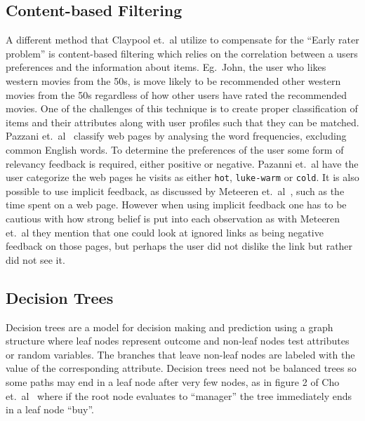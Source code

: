 
\subsection{Content-based Filtering}
\label{sec:analysis:recommender-methods:content-based-filtering}

A different method that Claypool et.~al utilize to compensate for the ``Early rater problem'' is content-based filtering which relies on the correlation between a users preferences and the information about items.
Eg.~John, the user who likes western movies from the 50s, is move likely to be recommended other western movies from the 50s regardless of how other users have rated the recommended movies.
One of the challenges of this technique is to create proper classification of items and their attributes along with user profiles such that they can be matched.
Pazzani et.~al~\cite{pazzani1996syskill} classify web pages by analysing the word frequencies, excluding common English words.
To determine the preferences of the user some form of relevancy feedback is required, either positive or negative.
Pazanni et.~al have the user categorize the web pages he visits as either \texttt{hot}, \texttt{luke-warm} or \texttt{cold}.
It is also possible to use implicit feedback, as discussed by Meteeren et.~al~\cite{van2000using}, such as the time spent on a web page.
However when using implicit feedback one has to be cautious with how strong belief is put into each observation as with Meteeren et.~al they mention that one could look at ignored links as being negative feedback on those pages, but perhaps the user did not dislike the link but rather did not see it.



\subsection{Decision Trees}
\label{sec:analysis:recommender-methods:decision-trees}

Decision trees are a model for decision making and prediction using a graph structure where leaf nodes represent outcome and non-leaf nodes test attributes or random variables.
The branches that leave non-leaf nodes are labeled with the value of the corresponding attribute.
Decision trees need not be balanced trees so some paths may end in a leaf node after very few nodes, as in figure 2 of Cho et.~al~\cite{cho2002personalized} where if the root node evaluates to ``manager'' the tree immediately ends in a leaf node ``buy''.

